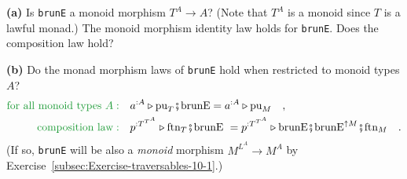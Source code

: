 \textbf{(a)} Is \lstinline!brunE! a monoid morphism $T^{A}\rightarrow A$?
(Note that $T^{A}$ is a monoid since $T$ is a lawful monad.) The
monoid morphism identity law holds for \lstinline!brunE!. Does the
composition law hold?

\textbf{(b)} Do the monad morphism laws of \lstinline!brunE! hold
when restricted to monoid types $A$?
\begin{align*}
{\color{greenunder}\text{for all monoid types }A:}\quad & a^{:A}\triangleright\text{pu}_{T}\bef\text{brunE}=a^{:A}\triangleright\text{pu}_{M}\quad,\\
{\color{greenunder}\text{composition law}:}\quad & p^{:T^{T^{A}}}\triangleright\text{ftn}_{T}\bef\text{brunE }=p^{:T^{T^{A}}}\triangleright\text{brunE}\bef\text{brunE}^{\uparrow M}\bef\text{ftn}_{M}\quad.
\end{align*}
(If so, \lstinline!brunE! will be also a \emph{monoid} morphism $M^{L^{A}}\rightarrow M^{A}$
by Exercise~\ref{subsec:Exercise-traversables-10-1}.) %
